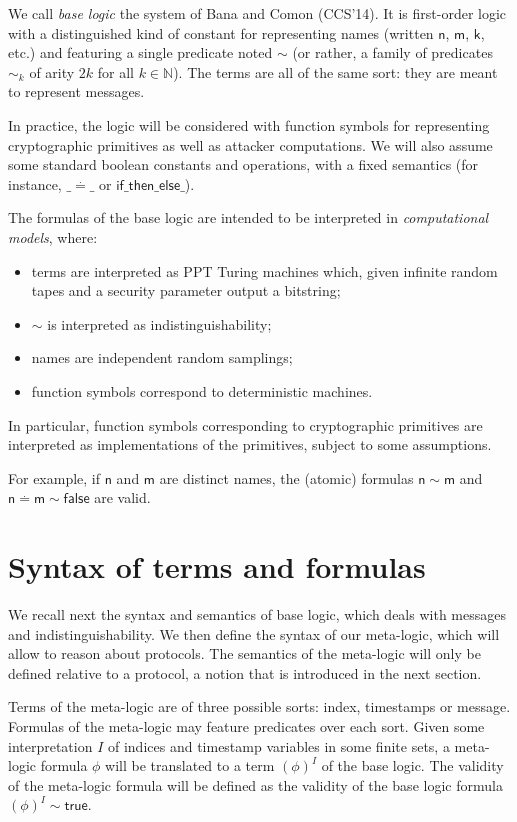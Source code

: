 We call \emph{base logic} the system of Bana and Comon (CCS'14).
It is first-order logic with a distinguished kind of constant for representing 
names (written $\mathsf{n}$, $\mathsf{m}$, $\mathsf{k}$, etc.)
and featuring a single predicate noted $\sim$ (or rather, a family
of predicates $\sim_k$ of arity $2 k$ for all $k\in\mathbb{N}$).
The terms are all of the same sort: they are meant to represent
messages.

In practice, the logic will be considered with function symbols for
representing cryptographic primitives as well as attacker computations.
We will also assume some standard boolean constants and operations, with
a fixed semantics (for instance, $\_ \stackrel{.}{=} \_$ or
$\mathsf{if \_ then \_ else \_}$).

The formulas of the base logic are intended to be interpreted in
\emph{computational models}, where:
\begin{itemize}
  \item terms are interpreted as PPT Turing machines which,
    given infinite random tapes and a security parameter output a bitstring;
  \item $\sim$ is interpreted as indistinguishability;
  \item names are independent random samplings;
  \item function symbols correspond to deterministic machines.
\end{itemize}

In particular, function symbols corresponding to cryptographic primitives
are interpreted as implementations of the primitives, subject to some
assumptions.

For example, if $\mathsf{n}$ and $\mathsf{m}$ are distinct names,
the (atomic) formulas $\mathsf{n}\sim\mathsf{m}$ and
$\mathsf{n}\stackrel{.}{=}\mathsf{m}\sim\mathsf{false}$
are valid.

\section{Syntax of terms and formulas}

We recall next the syntax and semantics of base logic, which deals with 
messages and indistinguishability.
We then define the syntax of our meta-logic, which will allow to reason about 
protocols. The semantics of the meta-logic will only be defined relative to a 
protocol, a notion that is introduced in the next section.

Terms of the meta-logic are of three possible sorts: index, timestamps
or message. Formulas of the meta-logic may feature predicates over each sort.
Given some interpretation $I$ of indices and timestamp variables in some finite
sets, a meta-logic formula $\phi$ will be translated to a term $(\phi)^I$
of the base logic.
The validity of the meta-logic formula will be defined as the validity of the 
base logic formula $(\phi)^I \sim \mathsf{true}$.

